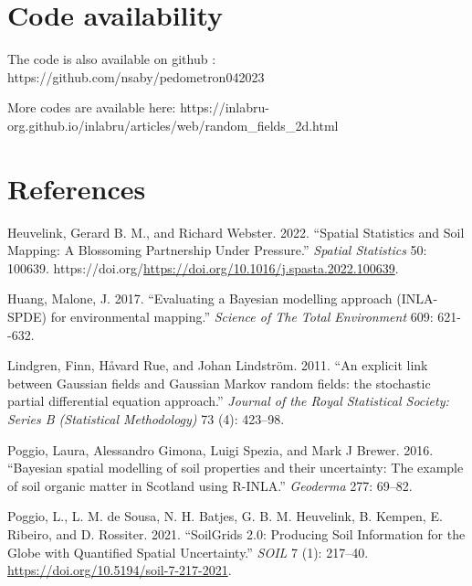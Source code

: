\documentclass[
  a4paper,
]{article}
\newlength{\cslhangindent}
\newlength{\cslentryspacingunit} %
\newenvironment{CSLReferences}[2] %
 {%
  \setlength{\parindent}{0pt}
  \ifodd #1
  \let\oldpar\par
  \def\par{\hangindent=\cslhangindent\oldpar}
  \fi
  \setlength{\parskip}{#2\cslentryspacingunit}
 }%
 {}
\begin{document}
\hypertarget{code-availability}{%
\section{Code availability}\label{code-availability}}

The code is also available on github :
https://github.com/nsaby/pedometron042023

More codes are available here:
https://inlabru-org.github.io/inlabru/articles/web/random\_fields\_2d.html

\hypertarget{references}{%
\section{References}\label{references}}

\hypertarget{refs}{}
\begin{CSLReferences}{1}{0}
\leavevmode{}%
Heuvelink, Gerard B. M., and Richard Webster. 2022. {``Spatial
Statistics and Soil Mapping: A Blossoming Partnership Under Pressure.''}
\emph{Spatial Statistics} 50: 100639.
https://doi.org/\url{https://doi.org/10.1016/j.spasta.2022.100639}.

\leavevmode{}%
Huang, Malone, J. 2017. {``{Evaluating a Bayesian modelling approach
(INLA-SPDE) for environmental mapping}.''} \emph{Science of The Total
Environment} 609: 621-\/-632.

\leavevmode{}%
Lindgren, Finn, Håvard Rue, and Johan Lindström. 2011. {``{An explicit
link between Gaussian fields and Gaussian Markov random fields: the
stochastic partial differential equation approach}.''} \emph{Journal of
the Royal Statistical Society: Series B (Statistical Methodology)} 73
(4): 423--98.

\leavevmode{}%
Poggio, Laura, Alessandro Gimona, Luigi Spezia, and Mark J Brewer. 2016.
{``{Bayesian spatial modelling of soil properties and their uncertainty:
The example of soil organic matter in Scotland using R-INLA}.''}
\emph{Geoderma} 277: 69--82.

\leavevmode{}%
Poggio, L., L. M. de Sousa, N. H. Batjes, G. B. M. Heuvelink, B. Kempen,
E. Ribeiro, and D. Rossiter. 2021. {``{SoilGrids} 2.0: Producing Soil
Information for the Globe with Quantified Spatial Uncertainty.''}
\emph{SOIL} 7 (1): 217--40.
\url{https://doi.org/10.5194/soil-7-217-2021}.


\end{CSLReferences}
\end{document}
